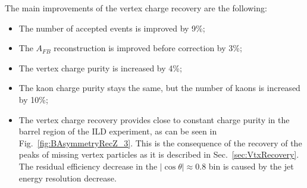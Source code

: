 The main improvements of the vertex charge recovery are the following:
\begin{itemize}
	\item The number of accepted events is improved by 9\%;
	\item The $A_{FB}$ reconstruction is improved before correction by 3\%;
	\item The vertex charge purity is increased by 4\%;
	\item The kaon charge purity stays the same, but the number of kaons is increased by 10\%; 
	\item The vertex charge recovery provides close to constant charge purity in the barrel region of the ILD experiment, as can be seen in Fig.~\ref{fig:BAsymmetryRecZ_3}. This is the consequence of the recovery of the peaks of missing vertex particles as it is described in Sec.~\ref{sec:VtxRecovery}.
	The residual efficiency decrease in the $|\cos\theta|\approx 0.8$ bin is caused by the jet energy resolution decrease.  
\end{itemize}

